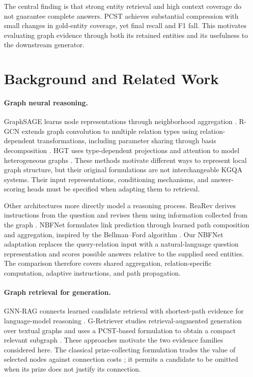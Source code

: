 \documentclass[10pt]{article}
\begin{document}
The central finding is that strong entity retrieval and high context coverage do not guarantee complete answers. PCST achieves substantial compression with small changes in gold-entity coverage, yet final recall and F1 fall. This motivates evaluating graph evidence through both its retained entities and its usefulness to the downstream generator.

\section{Background and Related Work}
\label{sec:related-work}

\paragraph{Graph neural reasoning.}
GraphSAGE learns node representations through neighborhood aggregation \citep{hamilton2017graphsage}. R-GCN extends graph convolution to multiple relation types using relation-dependent transformations, including parameter sharing through basis decomposition \citep{schlichtkrull2018rgcn}. HGT uses type-dependent projections and attention to model heterogeneous graphs \citep{hu2020hgt}. These methods motivate different ways to represent local graph structure, but their original formulations are not interchangeable KGQA systems. Their input representations, conditioning mechanisms, and answer-scoring heads must be specified when adapting them to retrieval.

Other architectures more directly model a reasoning process. ReaRev derives instructions from the question and revises them using information collected from the graph \citep{mavromatis2022rearev}. NBFNet formulates link prediction through learned path composition and aggregation, inspired by the Bellman--Ford algorithm \citep{zhu2021nbfnet}. Our NBFNet adaptation replaces the query-relation input with a natural-language question representation and scores possible answers relative to the supplied seed entities. The comparison therefore covers shared aggregation, relation-specific computation, adaptive instructions, and path propagation.

\paragraph{Graph retrieval for generation.}
GNN-RAG connects learned candidate retrieval with shortest-path evidence for language-model reasoning \citep{mavromatis2025gnnrag}. G-Retriever studies retrieval-augmented generation over textual graphs and uses a PCST-based formulation to obtain a compact relevant subgraph \citep{he2024gretriever}. These approaches motivate the two evidence families considered here. The classical prize-collecting formulation trades the value of selected nodes against connection costs \citep{goemans1995approximation}; it permits a candidate to be omitted when its prize does not justify its connection.
\end{document}
